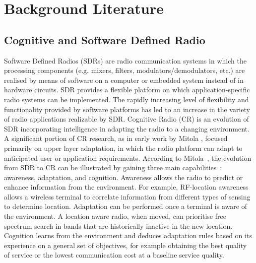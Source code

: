 \chapter{Background Literature}
\label{chap:BackgroundLiterature}

\section{Cognitive and Software Defined Radio}
Software Defined Radios (SDRs) are radio communication systems in which the processing components (e.g. mixers, filters, modulators/demodulators, etc.) are realised by means of software on a computer or embedded system instead of in hardware circuits.
SDR provides a flexible platform on which application-specific radio systems can be implemented. The rapidly increasing level of flexibility and functionality provided by software platforms has led to an increase in the variety of radio applications realizable by SDR.
Cognitive Radio (CR) is an evolution of SDR incorporating intelligence in adapting the radio to a changing environment.
A significant portion of CR research, as in early work by Mitola \cite{Mitola1999}, focused primarily on upper layer adaptation, in which the radio platform can adapt to anticipated user or application requirements.
According to Mitola~\cite{Mitola2006}, the evolution from SDR to CR can be illustrated by gaining three main capabilities~\cite{Recio2010a}: awareness, adaptation, and cognition.
Awareness allows the radio to predict or enhance information from the environment. For example, RF-location awareness allows a wireless terminal to correlate information from different types of sensing to determine location.
Adaptation can be performed once a terminal is aware of the environment. A location aware radio, when moved, can prioritise free spectrum search in bands that are historically inactive in the new location.
Cognition learns from the environment and deduces adaptation rules based on its experience on a general set of objectives, for example obtaining the best quality of service or the lowest communication cost at a baseline service quality.


